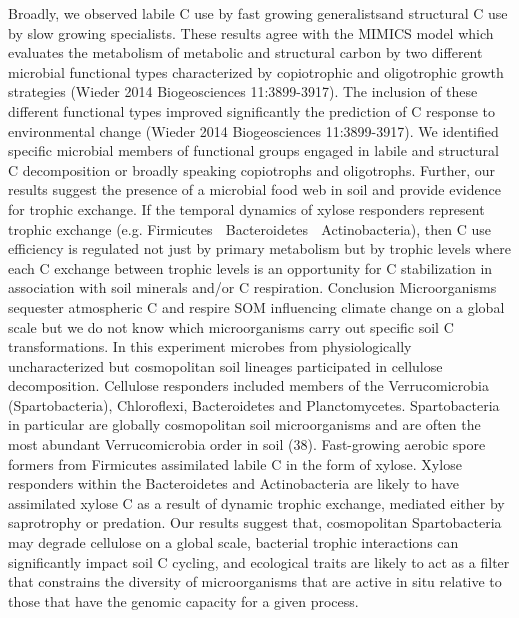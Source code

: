 Broadly, we observed labile C use by fast growing generalistsand structural
C use by slow growing specialists. These results agree with the MIMICS model
which evaluates the metabolism of metabolic and structural carbon by two
different microbial functional types characterized by copiotrophic and
oligotrophic growth strategies (Wieder 2014 Biogeosciences
11:3899-3917). The inclusion of these different functional types improved
significantly the prediction of C response to environmental change (Wieder 2014
Biogeosciences 11:3899-3917). We identified specific microbial members of
functional groups engaged in labile and structural C decomposition or broadly
speaking copiotrophs and oligotrophs.  Further, our results suggest the
presence of a microbial food web in soil and provide evidence for  trophic
exchange. If the temporal dynamics of xylose responders represent trophic
exchange (e.g. Firmicutes  Bacteroidetes  Actinobacteria), then C use
efficiency is regulated not just by primary metabolism but by trophic levels
where each C exchange between trophic levels is an opportunity for
C stabilization in association with soil minerals and/or C respiration.
Conclusion Microorganisms sequester atmospheric C and respire SOM influencing
climate change on a global scale but we do not know which microorganisms carry
out specific soil C transformations. In this experiment microbes from
physiologically uncharacterized but cosmopolitan soil lineages participated in
cellulose decomposition. Cellulose responders included members of the
Verrucomicrobia (Spartobacteria), Chloroflexi, Bacteroidetes and
Planctomycetes. Spartobacteria in particular are globally cosmopolitan soil
microorganisms and are often the most abundant Verrucomicrobia order in soil
(38). Fast-growing aerobic spore formers from Firmicutes assimilated labile
C in the form of xylose. Xylose responders within the Bacteroidetes and
Actinobacteria are likely to have assimilated xylose C as a result of dynamic
trophic exchange, mediated either by saprotrophy or predation. Our results
suggest that, cosmopolitan Spartobacteria may degrade cellulose on a global
scale, bacterial trophic interactions can significantly impact soil C cycling,
and ecological traits are likely to act as a filter that constrains the
diversity of microorganisms that are active in situ relative to those that have
the genomic capacity for a given process.

